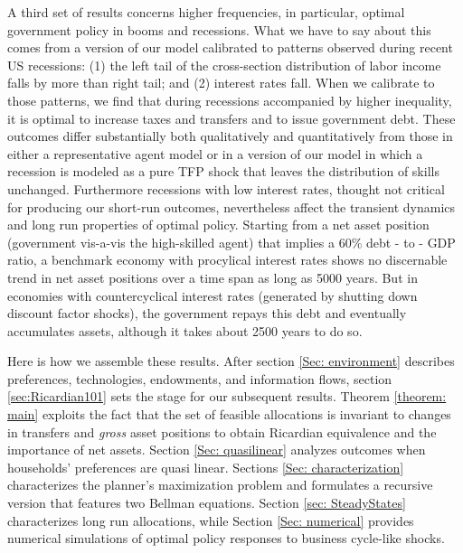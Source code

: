 \documentclass[thmsb,11pt]{article}
\begin{document}
A third set of results concerns higher frequencies, in particular,  optimal government policy in booms and recessions.
What we have to say about this comes from a  version of our model calibrated to patterns observed
 during recent US recessions:  (1) the left tail of the cross-section distribution of labor income falls by more than right tail; and (2) interest rates fall. When we calibrate  to those patterns, we find that during recessions accompanied by higher inequality, it is  optimal to increase taxes and transfers and to issue
government debt. %
These outcomes differ substantially both qualitatively and quantitatively from those in either a representative agent model or in a version of
 our model in which a  recession is modeled as a pure TFP shock that leaves the distribution of skills unchanged. Furthermore recessions with low interest rates, thought not critical for producing our short-run outcomes, nevertheless  affect the transient dynamics and long run properties of optimal policy. Starting from a net asset position (government vis-a-vis the high-skilled agent) that implies a 60\% debt - to - GDP ratio, a benchmark economy with procylical interest rates shows no discernable trend in net asset positions over a time span as long as 5000 years. But in economies with countercyclical interest rates  (generated by shutting down discount factor shocks), the government repays this debt and eventually accumulates assets, although it takes about 2500 years to do so.



Here is how we assemble these results.
After section \ref{Sec: environment} describes preferences, technologies, endowments, and
information flows, section
\ref{sec:Ricardian101} sets the stage for our subsequent results. Theorem \ref{theorem: main}
exploits the fact that the set of feasible allocations is invariant to changes in transfers and \emph{gross} asset positions to obtain  Ricardian equivalence and the importance of net assets.  Section \ref{Sec: quasilinear}
analyzes outcomes when households' preferences are quasi linear. Sections \ref{Sec: characterization} characterizes  the planner's maximization problem and formulates a recursive version that features two Bellman equations. Section \ref{sec: SteadyStates} characterizes  long run allocations, while Section \ref{Sec: numerical} provides numerical simulations of  optimal policy responses to business cycle-like shocks.
\end{document}
